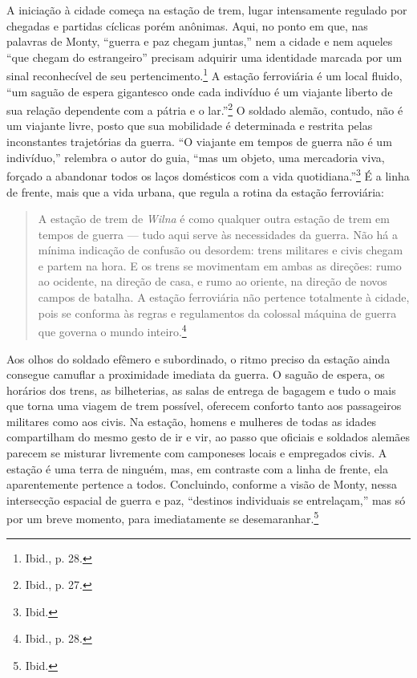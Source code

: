 \asterisc

A iniciação à cidade começa na estação de trem, lugar intensamente
regulado por chegadas e partidas cíclicas porém anônimas. Aqui, no ponto
em que, nas palavras de Monty, ``guerra e paz chegam juntas,'' nem a
cidade e nem aqueles ``que chegam do estrangeiro'' precisam adquirir uma
identidade marcada por um sinal reconhecível de seu
pertencimento.\footnote{Ibid., p. 28.} A estação ferroviária é um local
fluido, ``um saguão de espera gigantesco onde cada indivíduo é um
viajante liberto de sua relação dependente com a pátria e o
lar.''\footnote{Ibid., p. 27.} O soldado alemão, contudo, não é um
viajante livre, posto que sua mobilidade é determinada e restrita pelas
inconstantes trajetórias da guerra. ``O viajante em tempos de guerra não
é um indivíduo,'' relembra o autor do guia, ``mas um objeto, uma
mercadoria viva, forçado a abandonar todos os laços domésticos com a
vida quotidiana.''\footnote{Ibid.} É a linha de frente, mais que a vida
urbana, que regula a rotina da estação ferroviária:

%

\begin{quote}
A estação de trem de \textit{Wilna} é como qualquer outra estação de trem em
tempos de guerra --- tudo aqui serve às necessidades da guerra. Não há a
mínima indicação de confusão ou desordem: trens militares e civis chegam
e partem na hora. E os trens se movimentam em ambas as direções: rumo ao
ocidente, na direção de casa, e rumo ao oriente, na direção de novos
campos de batalha. A estação ferroviária não pertence totalmente à
cidade, pois se conforma às regras e regulamentos da colossal máquina de
guerra que governa o mundo inteiro.\footnote{Ibid., p. 28.}
\end{quote}

Aos olhos do soldado efêmero e subordinado, o ritmo preciso da estação
ainda consegue camuflar a proximidade imediata da guerra. O saguão de
espera, os horários dos trens, as bilheterias, as salas de entrega de
bagagem e tudo o mais que torna uma viagem de trem possível, oferecem
conforto tanto aos passageiros militares como aos civis. Na estação,
homens e mulheres de todas as idades compartilham do mesmo gesto de ir e
vir, ao passo que oficiais e soldados alemães parecem se misturar
livremente com camponeses locais e empregados civis. A estação é uma
terra de ninguém, mas, em contraste com a linha de frente, ela
aparentemente pertence a todos. Concluindo, conforme a visão de Monty,
nessa intersecção espacial de guerra e paz, ``destinos individuais se
entrelaçam,'' mas só por um breve momento, para imediatamente se
desemaranhar.\footnote{Ibid.}

